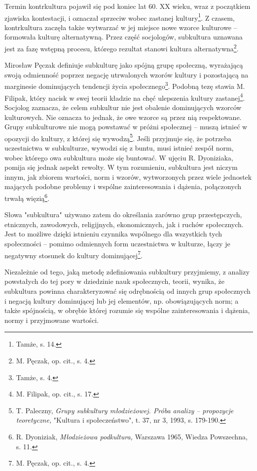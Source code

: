 \documentclass[12pt, a4paper, titlepage]{report}
\begin{document}
Termin kontrkultura pojawił się pod koniec lat 60. XX wieku, wraz z początkiem zjawiska kontestacji, i oznaczał sprzeciw wobec zastanej kultury\footnote{Tamże, s. 14.}. Z czasem, kontrkultura zaczęła także wytwarzać w jej miejsce nowe wzorce kulturowe -- formowała kulturę alternatywną. Przez część socjologów, subkultura uznawana jest za fazę wstępną procesu, którego rezultat stanowi kultura alternatywna\footnote{M. Pęczak, op. cit., s. 4.}.

Mirosław Pęczak definiuje subkulturę jako spójną grupę społeczną, wyrażającą swoją odmienność poprzez negację utrwalonych wzorów kultury i pozostającą na marginesie dominujących tendencji życia społecznego\footnote{Tamże, s. 4.}. Podobną tezę stawia M. Filipak, który nacisk w swej teorii kładzie na chęć ulepszenia kultury zastanej\footnote{M. Filipak, op. cit., s. 17.}. Socjolog zaznacza, że celem subkultur nie jest obalenie dominujących wzorców kulturowych. Nie oznacza to jednak, że owe wzorce są przez nią respektowane. Grupy subkulturowe nie mogą powstawać w próżni społecznej -- muszą istnieć w opozycji do kultury, z której się wywodzą\footnote{T. Paleczny, \textit{Grupy subkultury młodzieżowej. Próba analizy -- propozycje teoretyczne,} "Kultura i społeczeństwo", t. 37, nr 3, 1993, s. 179-190.}. Jeśli przyjmuje się, że potrzeba uczestnictwa w subkulturze, wywodzi się z buntu, musi istnieć zespół norm, wobec którego owa subkultura może się buntować. W ujęciu R. Dyoniziaka, pomija się jednak aspekt rewolty. W tym rozumieniu, subkultura jest niczym innym, jak zbiorem wartości, norm i wzorów, wytworzonych przez wiele jednostek mających podobne problemy i wspólne zainteresowania i dążenia, połączonych trwałą więzią\footnote{R. Dyoniziak, \textit{Młodzieżowa podkultura,} Warszawa 1965, Wiedza Powszechna, s. 11.}.

Słowa "subkultura" używano zatem do określania zarówno grup przestępczych, etnicznych, zawodowych, religijnych, ekonomicznych, jak i ruchów społecznych. Jest to możliwe dzięki istnieniu czynnika wspólnego dla wszystkich tych społeczności -- pomimo odmiennych form uczestnictwa w kulturze, łączy je negatywny stosunek do kultury dominującej\footnote{M. Pęczak, op. cit., s. 4.}.

Niezależnie od tego, jaką metodę zdefiniowania subkultury przyjmiemy, z analizy powstałych do tej pory w dziedzinie nauk społecznych, teorii, wynika, że subkultura powinna charakteryzować się odrębnością od innych grup społecznych i negacją kultury dominującej lub jej elementów, np. obowiązujących norm; a także spójnością, w obrębie której rozumie się wspólne zainteresowania i dążenia, normy i przyjmowane wartości. 
\end{document}
